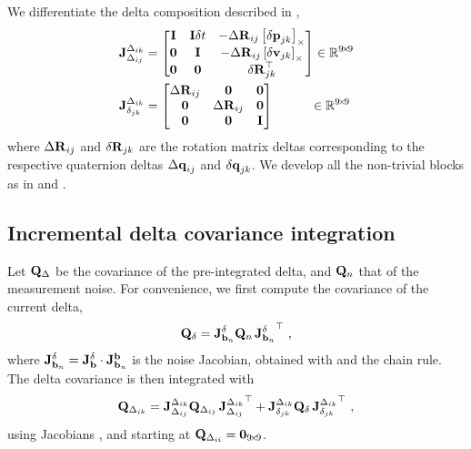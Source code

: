 We differentiate the delta composition  described in ,
%
\begin{subequations}\label{equ:jac_composition}
\begin{align}
{{\bf J}^{\Delta_{ik}}_{\Delta_{ij}}} &= \begin{bmatrix}
{\bf I}  & {\bf I}\delta t & - {\Delta{\bf R}}_{ij}  \left[{\delta{\bf p}}_{jk}\right]_\times  \\
\bf0  & {\bf I}    & - {\Delta{\bf R}}_{ij}  \left[{\delta{\bf v}}_{jk}\right]_\times \\
\bf0  & \bf0    &   {\delta{\bf R}}_{jk}^{\top} 
\end{bmatrix} 
\in {\mathbb R}^{9\!\times\!9}
\\
{{\bf J}^{\Delta_{ik}}_{\delta_{jk}}} &= \begin{bmatrix}
{\Delta{\bf R}}_{ij} & \bf0     & \bf0 \\
\bf0     & {\Delta{\bf R}}_{ij} & \bf0 \\
\bf0     & \bf0     & {\bf I}  
\end{bmatrix}
~~~~~~~~~\in {\mathbb R}^{9\!\times\!9}
\end{align}
\end{subequations}
%
where ${\Delta{\bf R}}_{ij}$ and ${\delta{\bf R}}_{jk}$ are the rotation matrix deltas corresponding to the respective quaternion deltas ${\Delta{\bf q}}_{ij}$ and ${\delta{\bf q}}_{jk}$. 
We develop all the non-trivial blocks as in  and .


\subsection{Incremental delta covariance integration}

Let ${\bf Q}_\Delta$ be the covariance of the pre-integrated delta, and ${\bf Q}_n$ that of the measurement noise. For convenience, we first compute the covariance of the current delta,
%
\begin{align}
{\bf Q}_\delta =  {{\bf J}^{\delta}_{{\bf b}_n}}{\bf Q}_n\,{{\bf J}^{\delta}_{{\bf b}_n}}^{\top}
~,
\end{align}
%
where ${{\bf J}^{\delta}_{{\bf b}_n}} = {{\bf J}^{\delta}_{{\bf b}}} \cdot {{\bf J}^{{\bf b}}_{{\bf b}_n}}
$ is the noise Jacobian, obtained with  and the chain rule.
The delta covariance is then integrated with
%
\begin{align}
{\bf Q}_{\Delta_{ik}} = {{\bf J}^{\Delta_{ik}}_{\Delta_{ij}}}{\bf Q}_{\Delta_{ij}}\,{{\bf J}^{\Delta_{ik}}_{\Delta_{ij}}}^{\top} + {{\bf J}^{\Delta_{ik}}_{\delta_{jk}}}{\bf Q}_\delta\,{{\bf J}^{\Delta_{ik}}_{\delta_{jk}}}^{\top}
~,
\end{align}
%
using Jacobians , and starting at ${\bf Q}_{\Delta_{ii}}={\bf0}_{9\!\times\!9}$.




